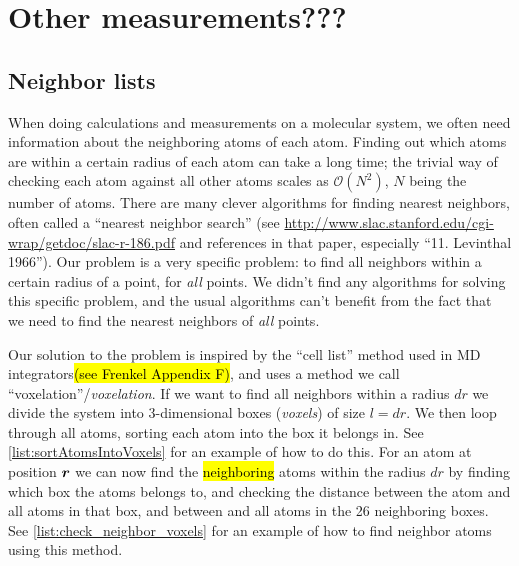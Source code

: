 \chapter{Other measurements???}
\section{Neighbor lists\label{sec:voxelation}}
When doing calculations and measurements on a molecular system, we often need information about the neighboring atoms of each atom. Finding out which atoms are within a certain radius of each atom can take a long time; the trivial way of checking each atom against all other atoms scales as $\mathcal{O}(N^2)$, $N$ being the number of atoms. There are many clever algorithms for finding nearest neighbors, often called a ``nearest neighbor search'' (see \url{http://www.slac.stanford.edu/cgi-wrap/getdoc/slac-r-186.pdf} and references in that paper, especially ``11. Levinthal 1966''). Our problem is a very specific problem: to find all neighbors within a certain radius of a point, for \emph{all} points. We didn't find any algorithms for solving this specific problem, and the usual algorithms can't benefit from the fact that we need to find the nearest neighbors of \emph{all} points.

Our solution to the problem is inspired by the ``cell list'' method used in MD integrators\hl{(see Frenkel Appendix F)}, and uses a method we call ``voxelation''/\emph{voxelation}. If we want to find all neighbors within a radius $dr$ we divide the system into 3-dimensional boxes (\emph{voxels}) of size $l = dr$. We then loop through all atoms, sorting each atom into the box it belongs in. See \cref{list:sortAtomsIntoVoxels} for an example of how to do this. For an atom at position $\boldsymbol{r}$ we can now find the \hl{neighboring} atoms within the radius $dr$ by finding which box the atoms belongs to, and checking the distance between the atom and all atoms in that box, and between and all atoms in the 26 neighboring boxes. See \cref{list:check_neighbor_voxels} for an example of how to find neighbor atoms using this method.


